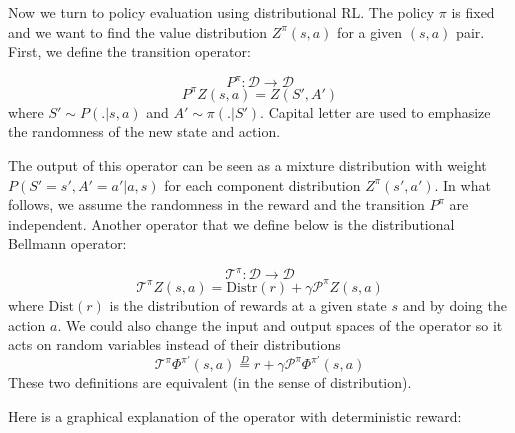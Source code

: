 \documentclass{article}
\begin{document}
Now we turn to policy evaluation using distributional RL. The policy $\pi$ is fixed and we want to find the value distribution $Z^\pi(s, a)$ for a given $(s,a)$ pair. First, we define the transition operator:
\begin{defn}
\label{def:Transition Operator}
$$P^\pi:\mathcal{D}\rightarrow \mathcal{D}$$
\begin{equation}
    P^\pi Z(s, a) = Z(S', A') 
\end{equation}
where $S'\sim P(.|s, a)$ and $A'\sim \pi(.|S')$. Capital letter are used to emphasize the randomness of the new state and action.
\end{defn} 
The output of this operator can be seen as a mixture distribution with weight $P(S'=s', A'=a'|a, s)$ for each component distribution $Z^\pi(s', a')$.
In what follows, we assume the randomness in the reward and the transition $P^\pi$ are independent. 
Another operator that we define below is the distributional Bellmann operator:
\begin{defn}
\label{def:Distributional Bellmann operator}
$$\mathcal{T}^\pi:\mathcal{D}\rightarrow \mathcal{D}$$
\begin{equation}
    \mathcal{T}^\pi Z(s, a) = \text{Distr}(r) + \gamma \mathcal{P}^\pi Z(s, a)
\end{equation}
where $\text{Dist}(r)$ is the distribution of rewards at a given state $s$ and by doing the action $a$.
We could also change the input and output spaces of the operator so it acts on random variables instead of their distributions
\begin{equation}
    \mathcal{T}^\pi \Phi^{\pi'}(s, a) \overset{D}{=} r + \gamma \mathcal{P}^\pi \Phi^{\pi'}(s, a)
\end{equation}
These two definitions are equivalent (in the sense of distribution).
\end{defn}
Here is a graphical explanation of the operator with deterministic reward:
\end{document}
